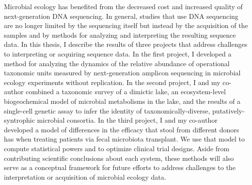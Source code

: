 Microbial ecology has benefited from the decreased cost and increased quality
of next-generation DNA sequencing. In general, studies that use DNA sequencing
are no longer limited by the sequencing itself but instead by the acquisition
of the samples and by methods for analyzing and interpreting the resulting
sequence data.
In this thesis, I describe the results of three projects that address challenges
to interpreting or acquiring sequence data.
In the first project,
I developed a method for analyzing the dynamics of the relative abundance of
operational taxonomic units measured by next-generation amplicon sequencing in 
microbial ecology experiments without replication. In the second project, I
and my co-author combined a taxonomic survey of a dimictic lake, an ecosystem-level
biogeochemical model of microbial metabolisms in the lake, and the results of
a single-cell genetic assay to infer the identity of taxonomically-diverse,
putatively-syntrophic microbial
consortia. In the third project, I and my co-author developed a model of differences
in the efficacy that stool from different donors has when treating patients
via fecal microbiota transplant. We use that model to compute statistical
powers and to optimize clinical trial designs.
Aside from contributing scientific conclusions about each system, these
methods will also serve as a conceptual framework for future efforts to address
challenges to the interpretation or acquisition of microbial ecology data. 
